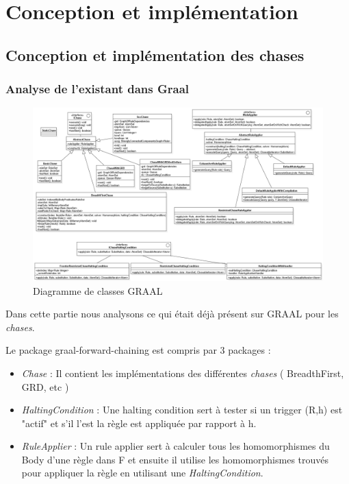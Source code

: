 \section{Conception et implémentation}\label{sec:conception_implementation}
    \subsection{Conception et implémentation des chases}
        \subsubsection{Analyse de l'existant dans Graal}
        \begin{figure}[H]
        \centering
        \includegraphics[width=\textwidth]{pictures/DiagrammeClasse.png}
        \caption{Diagramme de classes GRAAL}
        \label{fig:dclasse}
        \end{figure}
        
        Dans cette partie nous analysons ce qui était déjà présent sur GRAAL pour les \textit{chases}.
        
        Le package graal-forward-chaining est compris par 3 packages :
        \begin{itemize}
            \item \textit{Chase} : Il contient les implémentations des différentes \textit{chases} ( BreadthFirst, GRD, etc )
            \item \textit{HaltingCondition} : Une halting condition sert à tester si un trigger (R,h) est "actif" et s'il l'est la règle est appliquée par rapport à h.
            \item \textit{RuleApplier} : Un rule applier sert à calculer tous les homomorphismes du Body d'une règle dans F et ensuite il utilise les homomorphismes trouvés pour appliquer la règle en utilisant une \textit{HaltingCondition}.
        \end{itemize}
        

